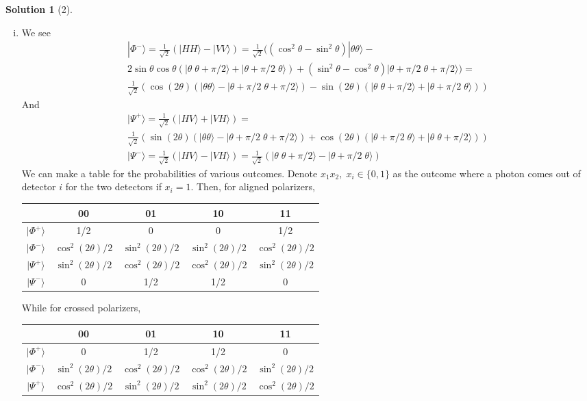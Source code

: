 \documentclass[11pt]{article}
\theoremstyle{definition}
\newtheorem*{solution}{Solution}
\newcommand{\eq}{\begin{equation}\begin{aligned}}
\newcommand{\qe}{\end{aligned}\end{equation}}
\newcommand{\ket}[1]{|#1\rangle}
\begin{document}
\begin{solution}[2]
\begin{enumerate}[(i)]
    \item We see
    \eq
      \ket{\Phi^-}=\frac{1}{\sqrt{2}}(\ket{HH}-\ket{VV})=\frac{1}{\sqrt{2}}((\cos^2\theta-\sin^2\theta)\ket{\theta\theta}-\\
      2\sin\theta\cos\theta(\ket{\theta\;\theta+\pi/2}+\ket{\theta+\pi/2\;\theta})+(\sin^2\theta-\cos^2\theta)\ket{\theta+\pi/2\;\theta+\pi/2})=\\
      \frac{1}{\sqrt{2}}(\cos (2\theta)(\ket{\theta\theta}-\ket{\theta+\pi/2\;\theta+\pi/2})-\sin(2\theta)(\ket{\theta\;\theta+\pi/2}+\ket{\theta+\pi/2\;\theta}))
    \qe
    And
    \eq
      \ket{\Psi^+}=\frac{1}{\sqrt{2}}(\ket{HV}+\ket{VH})=\\
      \frac{1}{\sqrt{2}}(\sin(2\theta)(\ket{\theta\theta}-\ket{\theta+\pi/2\;\theta+\pi/2})+\cos(2\theta)(\ket{\theta+\pi/2\;\theta}+\ket{\theta\;\theta+\pi/2}))\\
      \ket{\Psi^-}=\frac{1}{\sqrt{2}}(\ket{HV}-\ket{VH})=\frac{1}{\sqrt{2}}(\ket{\theta\;\theta+\pi/2}-\ket{\theta+\pi/2\;\theta})
    \qe
    We can make a table for the probabilities of various outcomes. Denote $x_1x_2,\;x_i\in\{0,1\}$ as the outcome where a photon comes out of detector $i$ for the two detectors if $x_i=1$. Then, for aligned polarizers,
    \begin{center}
      \begin{tabular}{c|c|c|c|c}
        & 00 & 01 & 10 & 11\\
        \hline 
        $\ket{\Phi^+}$ & 1/2 & 0 & 0 & 1/2\\
        $\ket{\Phi^-}$ & $\cos^2(2\theta)/2$ & $\sin^2(2\theta)/2$ & $\sin^2(2\theta)/2$ & $\cos^2(2\theta)/2$\\
        $\ket{\Psi^+}$ & $\sin^2(2\theta)/2$ & $\cos^2(2\theta)/2$ & $\cos^2(2\theta)/2$ & $\sin^2(2\theta)/2$\\
        $\ket{\Psi^-}$ & 0 & 1/2 & 1/2 & 0
      \end{tabular}
    \end{center}
    While for crossed polarizers,
    \begin{center}
      \begin{tabular}{c|c|c|c|c}
        & 00 & 01 & 10 & 11\\
        \hline 
        $\ket{\Phi^+}$ & 0 & 1/2 & 1/2 & 0 \\
        $\ket{\Phi^-}$ & $\sin^2(2\theta)/2$ & $\cos^2(2\theta)/2$ & $\cos^2(2\theta)/2$ & $\sin^2(2\theta)/2$ \\
        $\ket{\Psi^+}$ & $\cos^2(2\theta)/2$ & $\sin^2(2\theta)/2$ & $\sin^2(2\theta)/2$ & $\cos^2(2\theta)/2$\\

\end{tabular}
\end{center}
\end{enumerate}
\end{solution}
\end{document}
